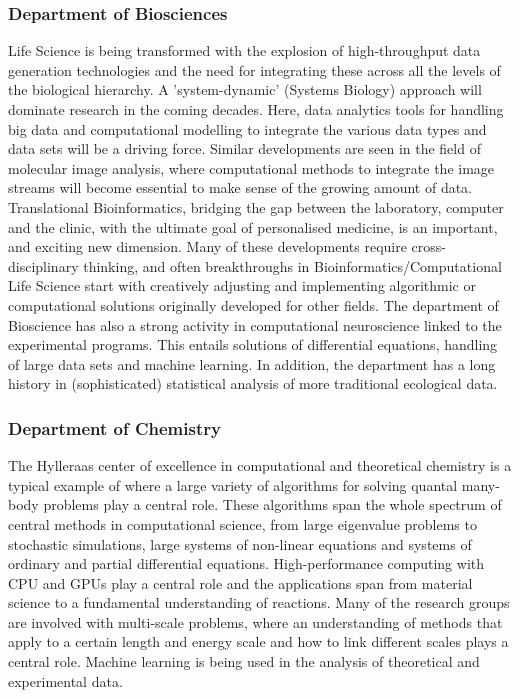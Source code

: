 \documentclass[a4paper,10pt]{article}
\begin{document}
\subsubsection*{Department of Biosciences}
Life Science is being transformed with the explosion of high-throughput data generation technologies and the need for integrating these across all the levels of the biological hierarchy. A 'system-dynamic' (Systems Biology) approach will dominate research in the coming decades. Here, data analytics tools for handling big data and computational modelling to integrate the various data types and data sets will be a driving force. Similar developments are seen in the field of molecular image analysis, where computational methods to integrate the image streams will become essential to make sense of the growing amount of data. Translational Bioinformatics, bridging the gap between the laboratory, computer and the clinic, with the ultimate goal of personalised medicine, is an important, and exciting new dimension. Many of these developments require cross-disciplinary thinking, and often breakthroughs in Bioinformatics/Computational Life Science start with creatively adjusting and implementing algorithmic or computational solutions originally developed for other fields.  The department of Bioscience has also a strong activity in computational neuroscience linked to the experimental programs. This entails solutions of differential equations, handling of large data sets and machine learning. In addition, the department has a long history in (sophisticated) statistical analysis of more traditional ecological data.

\subsubsection*{Department of Chemistry}

The Hylleraas center of excellence in computational and theoretical chemistry is a typical example of where a large variety of algorithms for solving quantal many-body problems play a central role. These algorithms span the whole spectrum of central methods in computational science, from large eigenvalue problems to stochastic simulations, large systems of non-linear equations and systems of ordinary and partial differential equations. High-performance computing with CPU and GPUs play a central role and the applications span from material science to a fundamental understanding of reactions. Many of the research groups are involved with multi-scale problems, where an understanding of methods that apply to a certain length and energy scale and how to link different scales plays a central role. Machine learning is being used in the analysis of theoretical and experimental data.
\end{document}
